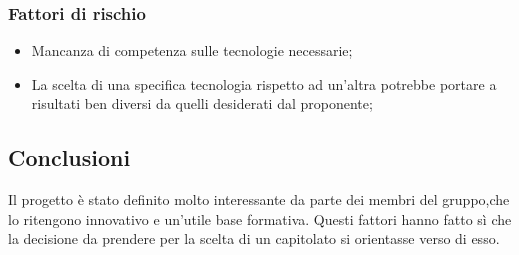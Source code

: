 		\subsubsection {Fattori di rischio}
			\begin {itemize}
				\item Mancanza di competenza sulle tecnologie necessarie;
				\item La scelta di una specifica tecnologia rispetto ad un'altra potrebbe portare a risultati ben diversi da quelli desiderati dal proponente;
			\end {itemize}
	\subsection {Conclusioni}
	Il progetto è stato definito molto interessante da parte dei membri del gruppo,che lo ritengono innovativo e un'utile base formativa. Questi fattori hanno fatto sì che la decisione da prendere per la scelta di un capitolato si orientasse verso di esso.